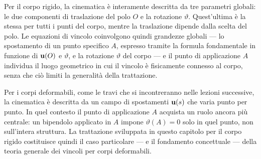 \begin{oss}
	Per il corpo rigido, la cinematica è interamente
	descritta da tre parametri globali: le due componenti
	di traslazione del polo $O$ e la rotazione $\vartheta$.
	Quest'ultima è la stessa per tutti i punti del corpo,
	mentre la traslazione dipende dalla scelta del polo.
	Le equazioni di vincolo coinvolgono quindi grandezze
	globali --- lo spostamento di un punto specifico $A$,
	espresso tramite la formula fondamentale in funzione
	di $\mathbf{u}(O)$ e $\vartheta$, e la rotazione $\vartheta$
	del corpo --- e il punto di applicazione $A$ individua
	il luogo geometrico in cui il vincolo è fisicamente
	connesso al corpo, senza che ciò limiti la generalità
	della trattazione.
	
	Per i corpi deformabili, come le travi che si 
	incontreranno nelle lezioni successive, la cinematica
	è descritta da un campo di spostamenti $\mathbf{u}(s)$ che
	varia punto per punto. In quel contesto il punto di
	applicazione $A$ acquista un ruolo ancora più centrale:
	un bipendolo applicato in $A$ impone $\vartheta(A) = 0$
	solo in quel punto, non sull'intera struttura. La
	trattazione sviluppata in questo capitolo per il corpo
	rigido costituisce quindi il caso particolare --- e il
	fondamento concettuale --- della teoria generale dei
	vincoli per corpi deformabili.
\end{oss}

